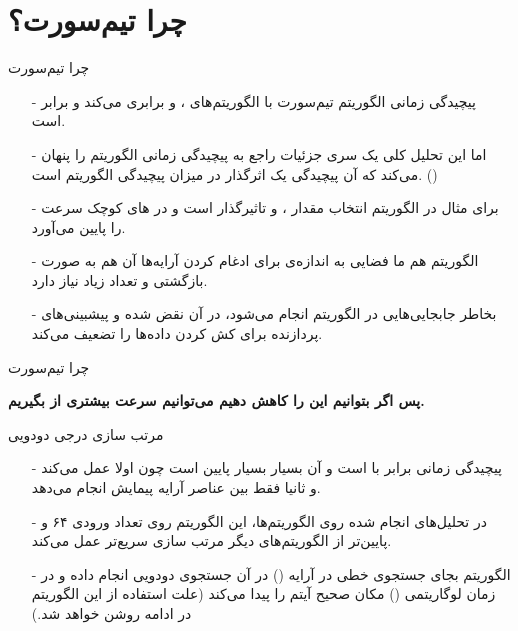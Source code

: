 \section{چرا تیم‌سورت؟}
\begin{frame}{چرا تیم‌سورت}
\begin{itemize}\itemr
\item[-]
پیچیدگی زمانی الگوریتم تیم‌سورت با الگوریتم‌های 
،
 و
برابری می‌کند و برابر 
است.

\item[-]
اما این تحلیل کلی یک سری جزئیات راجع به پیچیدگی زمانی الگوریتم را پنهان می‌کند که آن پیچیدگی یک 
اثرگذار در میزان پیچیدگی الگوریتم است. ()

\item[-]
برای مثال در الگوریتم  انتخاب مقدار 
،
 و
تاثیرگذار است و در های کوچک سرعت را پایین می‌آورد.

\item[-]
الگوریتم 
هم ما فضایی به اندازه‌ی  برای ادغام کردن آرایه‌ها آن هم به صورت بازگشتی و تعداد زیاد نیاز دارد.

\item[-]
بخاطر جابجایی‌هایی در الگوریتم  انجام می‌شود، 
در آن نقض شده و پیشبینی‌های پردازنده‌ برای کش کردن داده‌ها را تضعیف می‌کند.
\end{itemize}
\end{frame}

\begin{frame}{چرا تیم‌سورت}
\begin{center}
{\large \textbf{پس اگر بتوانیم این  را کاهش دهیم می‌توانیم سرعت بیشتری از  بگیریم.}}
\end{center}
\end{frame}

\begin{frame}{مرتب سازی درجی دودویی}
\begin{itemize}\itemr
\item[-]
پیچیدگی زمانی  برابر با 
است و 
آن بسیار بسیار پایین است چون اولا  عمل می‌کند و ثانیا فقط بین عناصر آرایه پیمایش انجام می‌دهد.

\item[-]
در تحلیل‌های انجام شده روی الگوریتم‌ها، این الگوریتم روی تعداد ورودی ۶۴ و پایین‌تر از الگوریتم‌های دیگر مرتب سازی سریع‌تر عمل می‌‌کند.

\item[-]
الگوریتم 
بجای جستجوی خطی در آرایه () در آن جستجوی دودویی انجام داده و در زمان لوگاریتمی () مکان صحیح آیتم را پیدا می‌‌کند (علت استفاده از این الگوریتم در ادامه روشن خواهد شد.)
\end{itemize}
\end{frame}

